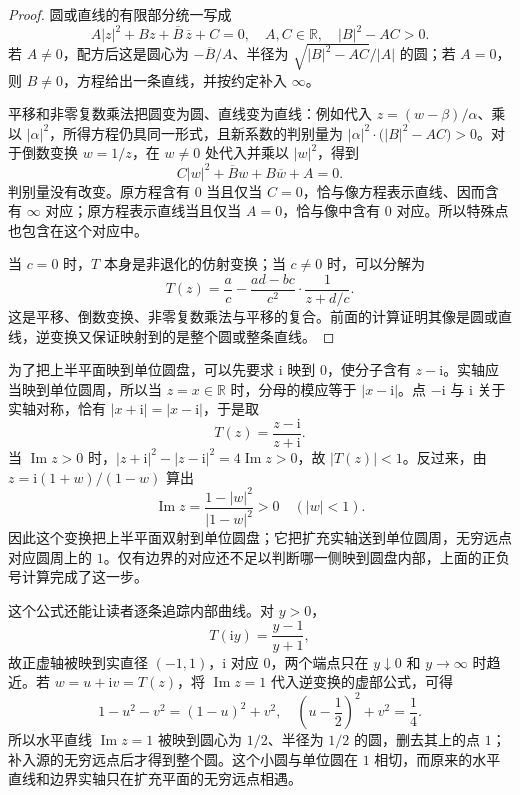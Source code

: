 \begin{proof}
圆或直线的有限部分统一写成
\[
A|z|^2+Bz+\overline B\,\overline z+C=0,
\quad A,C\in\mathbb R,
\quad |B|^2-AC>0.
\]
若 \(A\neq0\)，配方后这是圆心为 \(-\overline B/A\)、半径为 \(\sqrt{|B|^2-AC}/|A|\) 的圆；若 \(A=0\)，则 \(B\neq0\)，方程给出一条直线，并按约定补入 \(\infty\)。

平移和非零复数乘法把圆变为圆、直线变为直线：例如代入 \(z=(w-\beta)/\alpha\)、乘以 \(|\alpha|^2\)，所得方程仍具同一形式，且新系数的判别量为 \(|\alpha|^2\cdot\bigl(|B|^2-AC\bigr)>0\)。对于倒数变换 \(w=1/z\)，在 \(w\neq0\) 处代入并乘以 \(|w|^2\)，得到
\[
C|w|^2+\overline B w+B\overline w+A=0.
\]
判别量没有改变。原方程含有 \(0\) 当且仅当 \(C=0\)，恰与像方程表示直线、因而含有 \(\infty\) 对应；原方程表示直线当且仅当 \(A=0\)，恰与像中含有 \(0\) 对应。所以特殊点也包含在这个对应中。

当 \(c=0\) 时，\(T\) 本身是非退化的仿射变换；当 \(c\neq0\) 时，可以分解为
\[
T(z)=\frac ac-\frac{ad-bc}{c^2}\cdot\frac1{z+d/c}.
\]
这是平移、倒数变换、非零复数乘法与平移的复合。前面的计算证明其像是圆或直线，逆变换又保证映射到的是整个圆或整条直线。
\end{proof}

为了把上半平面映到单位圆盘，可以先要求 \(\mathrm{i}\) 映到 \(0\)，使分子含有 \(z-\mathrm{i}\)。实轴应当映到单位圆周，所以当 \(z=x\in\mathbb R\) 时，分母的模应等于 \(|x-\mathrm{i}|\)。点 \(-\mathrm{i}\) 与 \(\mathrm{i}\) 关于实轴对称，恰有 \(|x+\mathrm{i}|=|x-\mathrm{i}|\)，于是取
\[
T(z)=\frac{z-\mathrm{i}}{z+\mathrm{i}}.
\]
当 \(\operatorname{Im}z>0\) 时，\(|z+\mathrm{i}|^2-|z-\mathrm{i}|^2=4\operatorname{Im}z>0\)，故 \(|T(z)|<1\)。反过来，由 \(z=\mathrm{i}(1+w)/(1-w)\) 算出
\[
\operatorname{Im}z=\frac{1-|w|^2}{|1-w|^2}>0
\quad (|w|<1).
\]
因此这个变换把上半平面双射到单位圆盘；它把扩充实轴送到单位圆周，无穷远点对应圆周上的 \(1\)。仅有边界的对应还不足以判断哪一侧映到圆盘内部，上面的正负号计算完成了这一步。

\ProseParagraphBreak

这个公式还能让读者逐条追踪内部曲线。对 \(y>0\)，
\[
 T(\mathrm{i}y)=\frac{y-1}{y+1},
\]
故正虚轴被映到实直径 \((-1,1)\)，\(\mathrm{i}\) 对应 \(0\)，两个端点只在 \(y\downarrow0\) 和 \(y\to\infty\) 时趋近。若 \(w=u+\mathrm{i}v=T(z)\)，将 \(\operatorname{Im}z=1\) 代入逆变换的虚部公式，可得
\[
 1-u^2-v^2=(1-u)^2+v^2,
 \quad
 \left(u-\frac12\right)^2+v^2=\frac14.
\]
所以水平直线 \(\operatorname{Im}z=1\) 被映到圆心为 \(1/2\)、半径为 \(1/2\) 的圆，删去其上的点 \(1\)；补入源的无穷远点后才得到整个圆。这个小圆与单位圆在 \(1\) 相切，而原来的水平直线和边界实轴只在扩充平面的无穷远点相遇。

